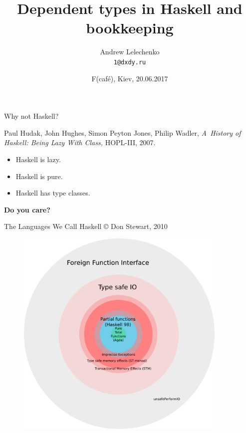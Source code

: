 \documentclass[handout]{beamer}
\title[Dependent bookkeeping]{Dependent types in Haskell and bookkeeping}
\author[Andrew Lelechenko]{Andrew Lelechenko \\ \texttt{1@dxdy.ru}}
\date{F(café), Kiev, 20.06.2017}
\begin{document}
\begin{frame}
	\titlepage
\end{frame}

\begin{frame}[fragile]{Why not Haskell?}

Paul Hudak, John Hughes, Simon Peyton Jones, Philip Wadler,
  {\em A~History of Haskell: Being Lazy With Class,} HOPL-III, 2007.

\bigskip

\begin{itemize}\itemsep2ex
\item Haskell is lazy.
\item Haskell is pure.
\item Haskell has type classes.
\end{itemize}

\bigskip

\centerline{\Huge\bf Do you care?}

\end{frame}

\begin{frame}[fragile]{The Languages We Call Haskell © Don Stewart, 2010}

\vspace{-1.5ex}

\begin{figure}[H]
\centering
\includegraphics[width=0.9\textwidth]{circles.png}
\end{figure}

\end{frame}
\end{document}
